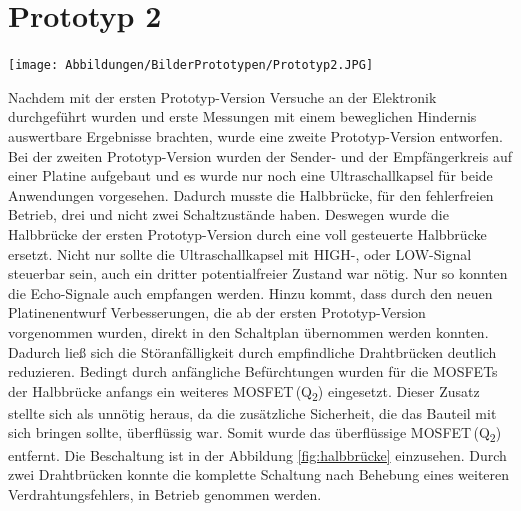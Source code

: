 \section{Prototyp 2}
\begin{center}
\begin{minipage}{0.75\textwidth}
\texttt{[image: Abbildungen/BilderPrototypen/Prototyp2.JPG]}
\label{fig:Prototyp2}
\end{minipage}
\end{center}
Nachdem mit der ersten Prototyp-Version Versuche an der Elektronik durchgeführt wurden und erste Messungen mit einem beweglichen Hindernis auswertbare Ergebnisse brachten, wurde eine zweite Prototyp-Version entworfen. Bei der zweiten Prototyp-Version wurden der Sender- und der Empfängerkreis auf einer Platine aufgebaut und es wurde nur noch eine Ultraschallkapsel für beide Anwendungen vorgesehen. Dadurch musste die Halbbrücke, für den fehlerfreien Betrieb, drei und nicht zwei Schaltzustände haben. Deswegen wurde die Halbbrücke der ersten Prototyp-Version durch eine voll gesteuerte Halbbrücke ersetzt. Nicht nur sollte die Ultraschallkapsel mit HIGH-, oder LOW-Signal steuerbar sein, auch ein dritter potentialfreier Zustand war nötig. Nur so konnten die Echo-Signale auch empfangen werden. Hinzu kommt, dass durch den neuen Platinenentwurf Verbesserungen, die ab der ersten Prototyp-Version vorgenommen wurden, direkt in den Schaltplan übernommen werden konnten. Dadurch ließ sich die Störanfälligkeit durch empfindliche Drahtbrücken deutlich reduzieren. Bedingt durch anfängliche Befürchtungen wurden für die MOSFETs der Halbbrücke anfangs ein weiteres MOSFET\,(Q\textsubscript{2}) eingesetzt. Dieser Zusatz stellte sich als unnötig heraus, da die zusätzliche Sicherheit, die das Bauteil mit sich bringen sollte, überflüssig war. Somit wurde das überflüssige MOSFET\,(Q\textsubscript{2}) entfernt. Die Beschaltung ist in der Abbildung \ref{fig:halbbrücke} einzusehen. Durch zwei Drahtbrücken konnte die komplette Schaltung nach Behebung eines weiteren Verdrahtungsfehlers, in Betrieb genommen werden.\\
